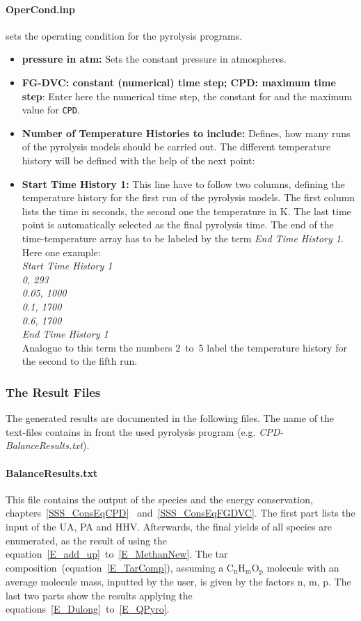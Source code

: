 \paragraph{OperCond.inp} sets the operating condition for the pyrolysis programs.
\begin{itemize}
  \item \textbf{pressure in atm:} Sets the constant pressure in atmospheres.
 \item \textbf{FG-DVC: constant (numerical) time step; CPD: maximum time step}: Enter here the numerical time step, the constant for \FGDVC and the maximum value for \texttt{CPD}.
 \item \textbf{Number of Temperature Histories to include:} Defines, how many runs of the pyrolysis  models should be carried out. The different temperature history will be defined with the help of the next point:
 \item \textbf{Start Time History 1:} This line have to follow two columns, defining the temperature history for the first run of the pyrolysis models. The first column lists the time in seconds, the second one the temperature in K. The last time point is automatically selected as the final pyrolysis time. The end of the time-temperature array has to be labeled by the term \emph{End Time History 1}. Here one example:\\
\emph{Start Time History 1\\
0, 293\\
0.05, 1000\\
0.1, 1700\\
0.6, 1700\\
End Time History 1\\}
Analogue to this term the numbers 2~to~5 label the temperature history for the second to the fifth run.
\end{itemize}


\subsubsection{The Result Files}\label{SSS_ResultsFiles}
The generated results are documented in the following files. The name of the text-files contains in front the used pyrolysis program (e.g. \emph{CPD-BalanceResults.txt}).

\paragraph{BalanceResults.txt}
This file contains the output of the species and the energy conservation, chapters~\ref{SSS_ConsEqCPD}
~and~\ref{SSS_ConsEqFGDVC}. The first part lists the input of the UA, PA and HHV. Afterwards, the final yields of all species are enumerated, as the result of using the equation~\ref{E_add_up}~to~\ref{E_MethanNew}. The tar composition~(equation~\ref{E_TarComp}), assuming a $\mathrm{C_nH_mO_p}$ molecule with an average molecule mass, inputted by the user, is given by the factors n, m, p. The last two parts show the results applying the equations~\ref{E_Dulong}~to~\ref{E_QPyro}.

